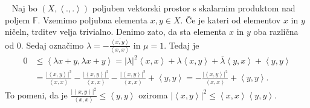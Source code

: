 \documentclass[12pt,a4paper,oneside,fleqn,openany]{book}
\newcommand{\eopf}{\raisebox{0.8ex}{\framebox{}}} %
\newenvironment{dokaz}%
{\noindent{\bf Dokaz.}\ }%
{\hfill\eopf\par\bigskip}%
\newcommand{\F}{\mathbb{F}}
\newcommand{\abs}[1]{\ensuremath{\lvert #1 \rvert}}
\newcommand{\Sp}[2]{\ensuremath{\left<#1, #2\right>}}
\begin{document}
\begin{dokaz}
	Naj bo $(X, \Sp{.}{.})$ poljuben vektorski prostor s skalarnim produktom nad poljem $\F$. Vzemimo poljubna elementa $x, y\in X$. Če je kateri od elementov $x$ in $y$ ničeln, trditev velja trivialno. Denimo zato, da sta elementa $x$ in $y$ oba različna od $0$. Sedaj označimo $\lambda=-\frac{\overline{\Sp{x}{y}}}{\Sp{x}{x}}$ in $\mu=1$. Tedaj je \begin{align*}
	0 &\leq\Sp{\lambda x + y}{\lambda x + y}=\abs{\lambda}^2\Sp{x}{x} + \lambda\Sp{x}{y} + \overline{\lambda}\Sp{y}{x} + \Sp{y}{y}\\ &=\frac{\abs{\Sp{x}{y}}^2}{\Sp{x}{x}} - \frac{\abs{\Sp{x}{y}}^2}{\Sp{x}{x}} - \frac{\abs{\Sp{x}{y}}^2}{\Sp{x}{x}} + \Sp{y}{y} = -\frac{\abs{\Sp{x}{y}}^2}{\Sp{x}{x}} + \Sp{y}{y}.
	\end{align*}
	To pomeni, da je $\frac{\abs{\Sp{x}{y}}^2}{\Sp{x}{x}} \leq \Sp{y}{y}$ oziroma $\abs{\Sp{x}{y}}^2\leq \Sp{x}{x}\Sp{y}{y}$.
\end{dokaz}
\end{document}

